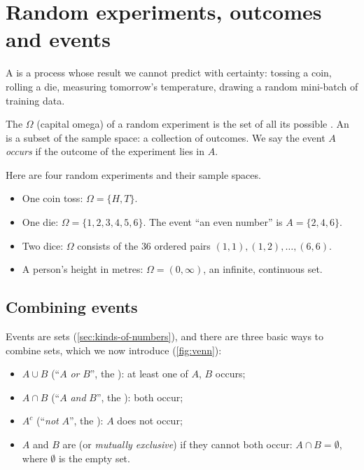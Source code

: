 \section{Random experiments, outcomes and events}\label{sec:events}

A  is a process whose result we cannot predict with
certainty: tossing a coin, rolling a die, measuring tomorrow's temperature,
drawing a random mini-batch of training data.

\begin{definition}\label{def:sample-space}
The  $\Omega$ (capital omega) of a random experiment is the
set of all its possible . An  is a subset
of the sample space: a collection of outcomes. We say the event $A$
\emph{occurs} if the outcome of the experiment lies in $A$.
\end{definition}

\begin{example}
Here are four random experiments and their sample spaces.
\begin{itemize}
  \item One coin toss: $\Omega = \{H, T\}$.
  \item One die: $\Omega = \{1, 2, 3, 4, 5, 6\}$. The event ``an even number'' is
    $A = \{2, 4, 6\}$.
  \item Two dice: $\Omega$ consists of the $36$ ordered pairs
    $(1,1), (1,2), \dots, (6,6)$.
  \item A person's height in metres: $\Omega = (0, \infty)$, an infinite,
    continuous set.
\end{itemize}
\end{example}

\subsection{Combining events}

Events are sets (\cref{sec:kinds-of-numbers}), and there are three basic ways
to combine sets, which we now introduce (\cref{fig:venn}):
\begin{itemize}
  \item $A \cup B$ (``$A$ \emph{or} $B$'', the ): at least one of
    $A$, $B$ occurs;
  \item $A \cap B$ (``$A$ \emph{and} $B$'', the ): both occur;
  \item $A^c$ (``\emph{not} $A$'', the ): $A$ does not occur;
  \item $A$ and $B$ are  (or \emph{mutually
    exclusive}) if they cannot both occur: $A \cap B = \emptyset$, where
    $\emptyset$ is the empty set.
\end{itemize}

